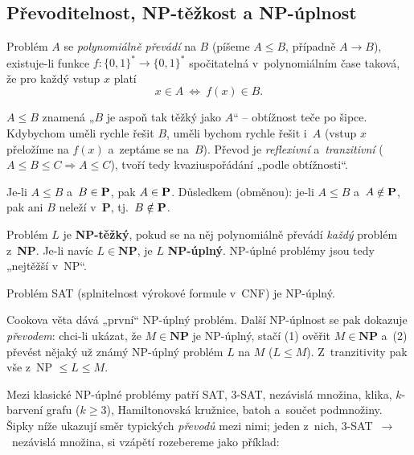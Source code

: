 \documentclass[11pt,a4paper]{article}
\begin{document}
\subsection{Převoditelnost, NP-těžkost a NP-úplnost}

\begin{definice}
Problém $A$ se \emph{polynomiálně převádí} na $B$ (píšeme $A\le B$, případně $A\to B$), existuje-li funkce $f\colon\{0,1\}^*\to\{0,1\}^*$ spočitatelná v~polynomiálním čase taková, že pro každý vstup $x$ platí
\[
x\in A\ \Longleftrightarrow\ f(x)\in B .
\]
\end{definice}

\begin{intuice}
$A\le B$ znamená „$B$ je aspoň tak těžký jako $A$`` -- obtížnost teče po šipce. Kdybychom uměli rychle řešit $B$, uměli bychom rychle řešit i~$A$ (vstup $x$ přeložíme na $f(x)$ a~zeptáme se na~$B$). Převod je \emph{reflexivní} a~\emph{tranzitivní} ($A\le B\le C\Rightarrow A\le C$), tvoří tedy kvaziuspořádání „podle obtížnosti``.
\end{intuice}

\begin{lemma}
Je-li $A\le B$ a~$B\in\textbf P$, pak $A\in\textbf P$. Důsledkem (obměnou): je-li $A\le B$ a~$A\notin\textbf P$, pak ani $B$ neleží v~\textbf P, tj.\ $B\notin\textbf P$.
\end{lemma}

\begin{definice}
Problém $L$ je \textbf{NP-těžký}, pokud se na něj polynomiálně převádí \emph{každý} problém z~\textbf{NP}. Je-li navíc $L\in\textbf{NP}$, je $L$ \textbf{NP-úplný}. NP-úplné problémy jsou tedy „nejtěžší v~NP``.
\end{definice}

\begin{veta}
Problém \textsc{SAT} (splnitelnost výrokové formule v~CNF) je NP-úplný.
\end{veta}

\begin{intuice}
Cookova věta dává „první`` NP-úplný problém. Další NP-úplnost se pak dokazuje \emph{převodem}: chci-li ukázat, že $M\in\textbf{NP}$ je NP-úplný, stačí (1) ověřit $M\in\textbf{NP}$ a~(2) převést nějaký už známý NP-úplný problém $L$ na $M$ ($L\le M$). Z~tranzitivity pak vše z~NP $\le L\le M$.
\end{intuice}

\begin{poznamka}
Mezi klasické NP-úplné problémy patří \textsc{SAT}, \textsc{3-SAT}, nezávislá množina, klika, $k$-barvení grafu ($k\ge3$), Hamiltonovská kružnice, batoh a~součet podmnožiny. Šipky níže ukazují směr typických \emph{převodů} mezi nimi; jeden z~nich, \textsc{3-SAT}~$\to$~nezávislá množina, si vzápětí rozebereme jako příklad:
\end{poznamka}
\end{document}

